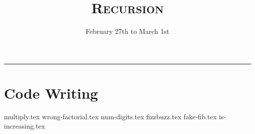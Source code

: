 \documentclass{exam}
\title{\textsc{Recursion}}
\date{February 27th to March 1st}
\begin{document}
\maketitle
\rule{\textwidth}{0.15em}
\fontsize{12}{15}\selectfont


\section{Code Writing}
\begin{questions}
{multiply.tex}
\newpage
{wrong-factorial.tex}
\newpage
{num-digits.tex}
\newpage
{fizzbuzz.tex}
\newpage
{fake-fib.tex}
\newpage
{is-increasing.tex}



\end{questions}
\end{document}
